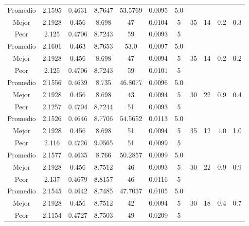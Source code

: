 \begin{table}[h!]
\begin{center}
\begin{tabular}{|c|c|c|c|c|c|c|c|c|c|c|}
        \hline
        \hline
            Promedio  & 2.1595 & 0.4631 & 8.7647 & 53.5769 & 0.0095 & 5.0 &  &  &  & \\
            \cline{1-7}
            Mejor & 2.1928 & 0.456  & 8.698 & 47 & 0.0104 & 5 & 35 & 14 & 0.2 & 0.3\\
            \cline{1-7}
            Peor & 2.125 & 0.4706  & 8.7243 & 59 & 0.0093 & 5 &  &  &  & \\
        \hline
        \hline
            Promedio  & 2.1601 & 0.463 & 8.7653 & 53.0 & 0.0097 & 5.0 &  &  &  & \\
            \cline{1-7}
            Mejor & 2.1928 & 0.456  & 8.698 & 47 & 0.0094 & 5 & 35 & 14 & 0.2 & 0.2\\
            \cline{1-7}
            Peor & 2.125 & 0.4706  & 8.7243 & 59 & 0.0101 & 5 &  &  &  & \\
        \hline
        \hline
            Promedio  & 2.1556 & 0.4639 & 8.735 & 46.8077 & 0.0096 & 5.0 &  &  &  & \\
            \cline{1-7}
            Mejor & 2.1928 & 0.456  & 8.698 & 43 & 0.0094 & 5 & 30 & 22 & 0.9 & 0.4\\
            \cline{1-7}
            Peor & 2.1257 & 0.4704  & 8.7244 & 51 & 0.0093 & 5 &  &  &  & \\
        \hline
        \hline
            Promedio  & 2.1526 & 0.4646 & 8.7706 & 54.5652 & 0.0113 & 5.0 &  &  &  & \\
            \cline{1-7}
            Mejor & 2.1928 & 0.456  & 8.698 & 51 & 0.0094 & 5 & 35 & 12 & 1.0 & 1.0\\
            \cline{1-7}
            Peor & 2.116 & 0.4726  & 9.0565 & 51 & 0.0099 & 5 &  &  &  & \\
        \hline
        \hline
            Promedio  & 2.1577 & 0.4635 & 8.766 & 50.2857 & 0.0099 & 5.0 &  &  &  & \\
            \cline{1-7}
            Mejor & 2.1928 & 0.456  & 8.7512 & 46 & 0.0093 & 5 & 30 & 22 & 0.9 & 0.9\\
            \cline{1-7}
            Peor & 2.137 & 0.4679  & 8.8157 & 46 & 0.0116 & 5 &  &  &  & \\
        \hline
        \hline
            Promedio  & 2.1545 & 0.4642 & 8.7485 & 47.7037 & 0.0105 & 5.0 &  &  &  & \\
            \cline{1-7}
            Mejor & 2.1928 & 0.456  & 8.7512 & 42 & 0.0094 & 5 & 30 & 18 & 0.4 & 0.7\\
            \cline{1-7}
            Peor & 2.1154 & 0.4727  & 8.7503 & 49 & 0.0209 & 5 &  &  &  & \\

\end{tabular}
\end{center}
\end{table}

